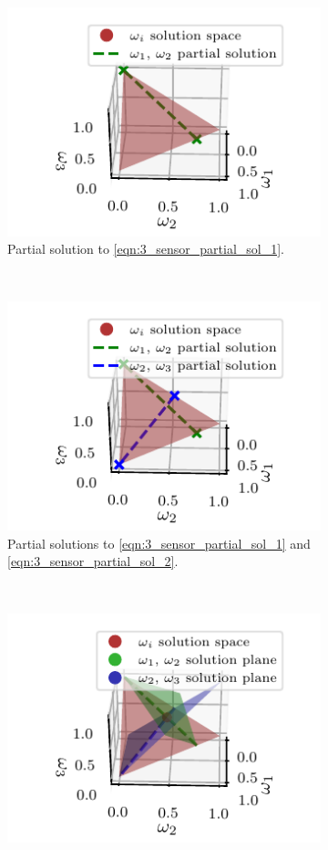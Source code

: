 \begin{figure}[tb]
   \begin{subfigure}[t]{0.3\textwidth}
      \begin{center}
         \includegraphics{figures/partial_sol1.pdf}
      \end{center}
      \caption{Partial solution to \eqref{eqn:3_sensor_partial_sol_1}.}
      \label{fig:3_sensor_partial_sol}
   \end{subfigure}
   ~
   \begin{subfigure}[t]{0.3\textwidth}
      \begin{center}
         \includegraphics{figures/partial_sols.pdf}
      \end{center}
      \caption{Partial solutions to \eqref{eqn:3_sensor_partial_sol_1} and \eqref{eqn:3_sensor_partial_sol_2}.}
      \label{fig:3_sensor_partial_sols}
   \end{subfigure}
   ~
   \begin{subfigure}[t]{0.3\textwidth}
      \begin{center}
         \includegraphics{figures/partial_sol_planes.pdf}

\end{center}
\end{subfigure}
\end{figure}
